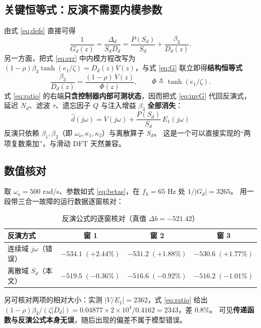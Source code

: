 \documentclass[11pt,a4paper]{ctexart}
\begin{document}
\subsection{关键恒等式：反演不需要内模参数}

由式 \eqref{eq:defs} 直接可得
\begin{equation}
\frac{1}{G_d(z)}=\frac{\Delta_d}{S_dD_d}=\frac{P(S_d)}{S_d}+\frac{\beta_3}{D_d(z)} .
\label{eq:invG}
\end{equation}
另一方面，把式 \eqref{eq:err} 中内模方程改写为
$(1-\rho)\beta_3\tanh(e_1/\zeta)=D_d(z)V(z)$，与式 \eqref{eq:G} 联立即得\textbf{结构恒等式}
\begin{equation}
\frac{\beta_3}{D_d(z)}=\frac{(1-\rho)\,V(z)}{\Phi(z)},\qquad \Phi\triangleq\tanh(e_1/\zeta).
\label{eq:ratio}
\end{equation}
式 \eqref{eq:ratio} 的右端\textbf{只含控制器内部可测状态}，因而把式 \eqref{eq:invG} 代回反演式，
延迟 $N_d$、滤波 $\tau$、遗忘因子 $Q$ 与注入增益 $\beta_3$ \textbf{全部消失}：
\begin{equation}
\boxed{\;\hat d(j\omega)=V(j\omega)+\frac{P(S_d)}{S_d}\,E_1(j\omega)\;}
\label{eq:dhat}
\end{equation}
反演只依赖 $\beta_1,\beta_2$（即 $\omega_o,\kappa_1,\kappa_2$）与离散算子 $S_d$。
这是一个可以直接实现的“两项复数乘加”，与滑动 DFT 天然兼容。

\subsection{数值核对}

取 $\omega_o=500$ rad/s、参数如式 \eqref{eq:betas}，在 $f_h=65$ Hz 处 $1/|G_d|=3265$。
用一段带三合一故障的运行数据逐窗核对：

\begin{table}[h]
\centering
\caption{反演公式的逐窗核对（真值 $\Delta b=-521.42$）}
\label{tab:invG}
\begin{tabular}{lccc}
\toprule
反演方式 & 窗 1 & 窗 2 & 窗 3 \\
\midrule
连续域 $j\omega$（错误） & $-534.1\;(+2.44\%)$ & $-531.2\;(+1.88\%)$ & $-530.6\;(+1.77\%)$\\
离散域 $S_d$（本文） & $-519.5\;(-0.36\%)$ & $-516.6\;(-0.92\%)$ & $-516.2\;(-1.01\%)$\\
\bottomrule
\end{tabular}
\end{table}

另可核对两项的相对大小：实测 $|V/E_1|=2362$，式 \eqref{eq:ratio} 给出
$(1-\rho)\beta_3/(\zeta|D_d|)=0.04877\times 2\times10^4/0.4162=2343$，差 $0.8\%$。
可见\textbf{传递函数与反演公式本身无误}，随后出现的偏差不属于模型错误。
\end{document}
